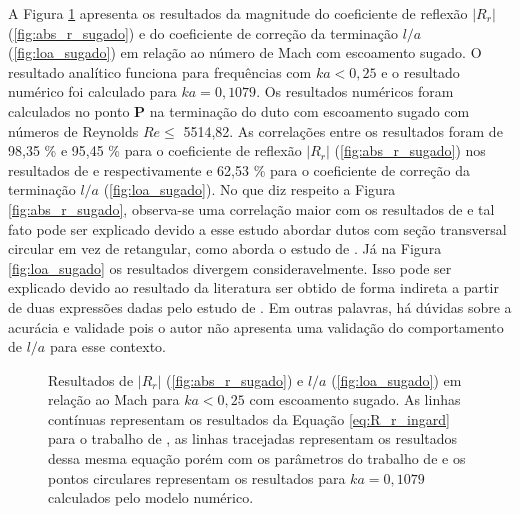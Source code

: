 A Figura \ref{fig:resultados_sugado} apresenta os resultados da magnitude do coeficiente de reflexão $|R_{r}|$ (\ref{fig:abs_r_sugado}) e do coeficiente de correção da terminação $l/a$ (\ref{fig:loa_sugado}) em relação ao número de Mach com escoamento sugado. O resultado analítico funciona para frequências com $ka < 0,25$ e o resultado numérico foi calculado para $ka = 0,1079$. Os resultados numéricos foram calculados no ponto $\textbf{P}$ na terminação do duto com escoamento sugado com números de Reynolds $Re \leq$ 5514,82. As correlações entre os resultados foram de 98,35 \% e 95,45 \% para o coeficiente de reflexão $|R_{r}|$ (\ref{fig:abs_r_sugado}) nos resultados de  e  respectivamente e 62,53 \% para o coeficiente de correção da terminação $l/a$ (\ref{fig:loa_sugado}). No que diz respeito a Figura \ref{fig:abs_r_sugado}, observa-se uma correlação maior com os resultados de  e tal fato pode ser explicado devido a esse estudo abordar dutos com seção transversal circular em vez de retangular, como aborda o estudo de . Já na Figura \ref{fig:loa_sugado} os resultados divergem consideravelmente. Isso pode ser explicado devido ao resultado da literatura ser obtido de forma indireta a partir de duas expressões dadas pelo estudo de . Em outras palavras, há dúvidas sobre a acurácia e validade pois o autor não apresenta uma validação do comportamento de $l/a$ para esse contexto.

\begin{figure}[ht!]
\begin{subfigure}{\scaleA \textwidth}
  
\end{subfigure}%
\begin{subfigure}{\scaleA \textwidth}
  
\end{subfigure}
\caption[Resultados de $|R_{r}|$ e $l/a$ em relação ao número de Mach para baixas frequências com escoamento sugado]{Resultados de $|R_{r}|$ (\ref{fig:abs_r_sugado}) e $l/a$ (\ref{fig:loa_sugado}) em relação ao Mach para $ka < 0,25$ com escoamento sugado. As linhas contínuas representam os resultados da Equação \ref{eq:R_r_ingard} para o trabalho de , as linhas tracejadas representam os resultados dessa mesma equação porém com os parâmetros do trabalho de  e os pontos circulares representam os resultados para $ka = 0,1079$ calculados pelo modelo numérico.}
\label{fig:resultados_sugado}
\end{figure}

